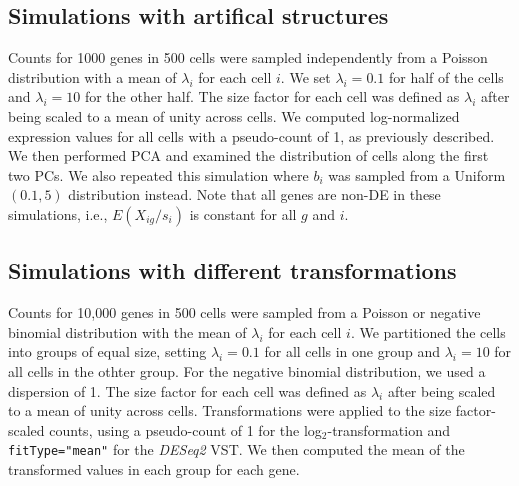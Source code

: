 \documentclass[10pt,letterpaper]{article}
\newcommand\code[1]{{\small\texttt{#1}}}
\begin{document}
\subsection{Simulations with artifical structures}
Counts for 1000 genes in 500 cells were sampled independently from a Poisson distribution with a mean of $\lambda_i$ for each cell $i$. 
We set $\lambda_i=0.1$ for half of the cells and $\lambda_i=10$ for the other half.
The size factor for each cell was defined as $\lambda_i$ after being scaled to a mean of unity across cells.
We computed log-normalized expression values for all cells with a pseudo-count of 1, as previously described.
We then performed PCA and examined the distribution of cells along the first two PCs.
We also repeated this simulation where $b_i$ was sampled from a Uniform$(0.1, 5)$ distribution instead.
Note that all genes are non-DE in these simulations, i.e., $E(X_{ig}/s_i)$ is constant for all $g$ and $i$.

\subsection{Simulations with different transformations}
Counts for 10,000 genes in 500 cells were sampled from a Poisson or negative binomial distribution with the mean of $\lambda_i$ for each cell $i$.
We partitioned the cells into groups of equal size, setting $\lambda_i=0.1$ for all cells in one group and $\lambda_i=10$ for all cells in the othter group.
For the negative binomial distribution, we used a dispersion of 1.
The size factor for each cell was defined as $\lambda_i$ after being scaled to a mean of unity across cells.
Transformations were applied to the size factor-scaled counts, using a pseudo-count of 1 for the log$_2$-transformation and \code{fitType="mean"} for the \textit{DESeq2} VST.
We then computed the mean of the transformed values in each group for each gene.



\end{document}
